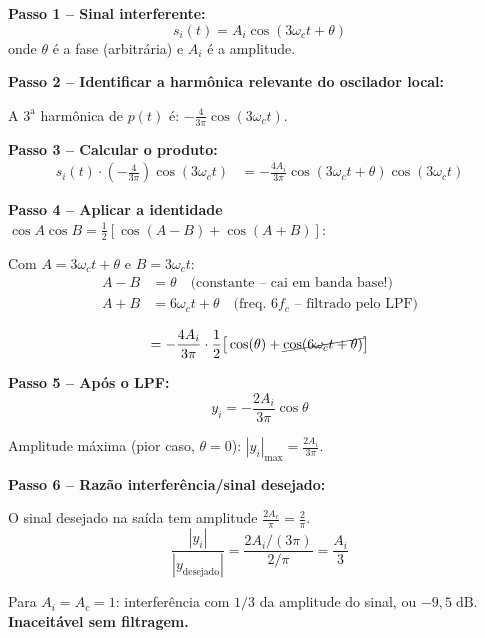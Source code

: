 \documentclass[11pt,a4paper]{article}
\begin{document}
\begin{resolucao}

\textbf{Passo 1 -- Sinal interferente:}
\[
  s_i(t) = A_i\cos(3\omega_c t + \theta)
\]
onde $\theta$ é a fase (arbitrária) e $A_i$ é a amplitude.

\textbf{Passo 2 -- Identificar a harmônica relevante do oscilador local:}

A $3^{\text{a}}$ harmônica de $p(t)$ é: $-\frac{4}{3\pi}\cos(3\omega_c t)$.

\textbf{Passo 3 -- Calcular o produto:}
\begin{align*}
  s_i(t) \cdot \left(-\frac{4}{3\pi}\right)\cos(3\omega_c t) &= -\frac{4A_i}{3\pi}\cos(3\omega_c t + \theta)\cos(3\omega_c t)
\end{align*}

\textbf{Passo 4 -- Aplicar a identidade} $\cos A \cos B = \tfrac{1}{2}[\cos(A-B) + \cos(A+B)]$:

Com $A = 3\omega_c t + \theta$ e $B = 3\omega_c t$:
\begin{align*}
  A - B &= \theta \quad \text{(constante -- cai em banda base!)} \\
  A + B &= 6\omega_c t + \theta \quad \text{(freq. $6f_c$ -- filtrado pelo LPF)}
\end{align*}

\[
  = -\frac{4A_i}{3\pi} \cdot \frac{1}{2}\big[\cos(\theta) + \cancel{\cos(6\omega_c t + \theta)}\big]
\]

\textbf{Passo 5 -- Após o LPF:}
\[
  y_i = -\frac{2A_i}{3\pi}\cos\theta
\]

Amplitude máxima (pior caso, $\theta = 0$): $|y_i|_{\max} = \frac{2A_i}{3\pi}$.

\textbf{Passo 6 -- Razão interferência/sinal desejado:}

O sinal desejado na saída tem amplitude $\frac{2A_c}{\pi} = \frac{2}{\pi}$.
\[
  \boxed{\frac{|y_i|}{|y_{\text{desejado}}|} = \frac{2A_i/(3\pi)}{2/\pi} = \frac{A_i}{3}}
\]

Para $A_i = A_c = 1$: interferência com $1/3$ da amplitude do sinal, ou $-9{,}5\;\text{dB}$. \textbf{Inaceitável sem filtragem.}
\end{resolucao}
\end{document}
